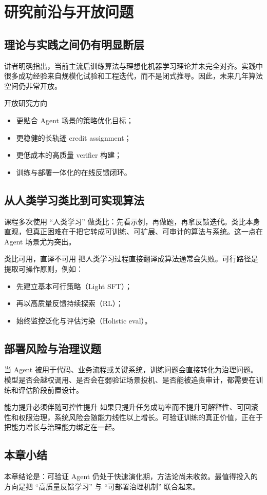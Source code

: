 \section{研究前沿与开放问题}

\subsection{理论与实践之间仍有明显断层}
讲者明确指出，当前主流后训练算法与理想化机器学习理论并未完全对齐。实践中很多成功经验来自规模化试验和工程迭代，而不是闭式推导。因此，未来几年算法空间仍非常开放。

\begin{importantbox}{开放研究方向}
\begin{itemize}
    \item 更贴合 Agent 场景的策略优化目标；
    \item 更稳健的长轨迹 credit assignment；
    \item 更低成本的高质量 verifier 构建；
    \item 训练与部署一体化的在线反馈闭环。
\end{itemize}
\end{importantbox}

\subsection{从人类学习类比到可实现算法}
课程多次使用 ``人类学习'' 做类比：先看示例，再做题，再拿反馈迭代。类比本身直观，但真正困难在于把它转成可训练、可扩展、可审计的算法与系统。这一点在 Agent 场景尤为突出。

\begin{knowledgebox}{类比可用，直译不可用}
把人类学习过程直接翻译成算法通常会失败。可行路径是提取可操作原则，例如：
\begin{itemize}
    \item 先建立基本可行策略（Light SFT）；
    \item 再以高质量反馈持续探索（RL）；
    \item 始终监控泛化与评估污染（Holistic eval）。
\end{itemize}
\end{knowledgebox}

\subsection{部署风险与治理议题}
当 Agent 被用于代码、业务流程或关键系统，训练问题会直接转化为治理问题。模型是否会越权调用、是否会在弱验证场景投机、是否能被追责审计，都需要在训练和评估阶段前置设计。

\begin{warningbox}{能力提升必须伴随可控性提升}
如果只提升任务成功率而不提升可解释性、可回滚性和权限治理，系统风险会随能力线性以上增长。可验证训练的真正价值，正在于把能力增长与治理能力绑定在一起。
\end{warningbox}

\subsection{本章小结}
本章结论是：可验证 Agent 仍处于快速演化期，方法论尚未收敛。最值得投入的方向是把 ``高质量反馈学习'' 与 ``可部署治理机制'' 联合起来。

